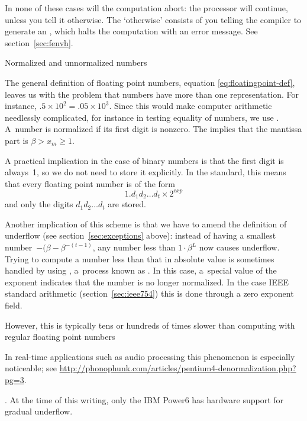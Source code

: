 In none of these cases will the computation abort:
the processor will continue, unless you tell it otherwise.
The `otherwise' consists of you telling the compiler to generate an ,
which halts the computation with an error message. See section~\ref{sec:fenvh}.

 {Normalized and unnormalized numbers}
\label{sec:normal-unnormal}

The general definition of floating point numbers,
equation \eqref{eq:floatingpoint-def}, leaves us with the problem that numbers
have more than one representation. For instance,
$.5\times10^{2}=.05\times 10^3$. Since this would make computer
arithmetic needlessly complicated, for instance in testing equality of
numbers, we use . A~number is normalized if its first digit is nonzero.
The implies that the mantissa part is $\beta> x_m\geq 1$.

A practical implication in the case of binary numbers is that the
first digit is always~1, so we do not need to store it explicitly.
In the  standard, this means that every floating point number
is of the form
\[ 1.d_1d_2\ldots d_t\times 2^{\mathrm exp}\]
and only the digits $d_1d_2\ldots d_t$ are stored.

Another implication of this scheme is that we have to amend the
definition of underflow (see section~\ref{sec:exceptions} above):
instead of having a smallest number~$-(\beta-\beta^{-(t-1)}$,
any number less than $1\cdot\beta^L$ now causes underflow. Trying
  to compute a number less than that in absolute value is sometimes
  handled by using ,
  a~process known as . In this case, a~special
value of the exponent indicates that the number is no longer normalized.
In the case IEEE standard arithmetic (section~\ref{sec:ieee754})
this is done through a zero exponent field.

However, this is typically tens or hundreds of times slower than
computing with regular floating point numbers
\begin{footnoteenv}
  {In real-time
applications such as audio processing this phenomenon is especially
noticeable;
see
\url{http://phonophunk.com/articles/pentium4-denormalization.php?pg=3}.}
\end{footnoteenv}
. 
At the time of this writing, only the IBM Power6 has
hardware support for gradual underflow.

